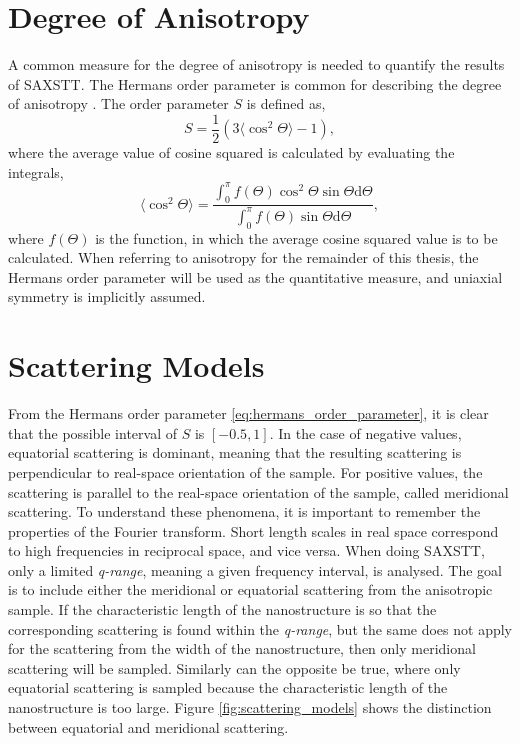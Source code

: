 \section{Degree of Anisotropy} %

A common measure for the degree of anisotropy is needed to quantify the results of SAXSTT.
The Hermans order parameter is common for describing the degree of anisotropy \cite{yoshiharu1997cellulose}.
The order parameter $S$ is defined as,
\begin{equation}\label{eq:hermans_order_parameter}
    S = \frac{1}{2} \left( 3 \langle\cos^{2} \Theta\rangle - 1 \right),
\end{equation}
where the average value of cosine squared is calculated by evaluating the integrals,
\begin{equation}
    \langle\cos^{2} \Theta\rangle = \frac{ \int_{0}^{\pi} f (\Theta) \cos^{2} \Theta \sin \Theta  \mathrm{d}\Theta  }
    {\int_{0}^{\pi} f (\Theta) \sin \Theta  \mathrm{d}\Theta },
\end{equation}
\noindent
where $f(\Theta)$ is the function, in which the average cosine squared value is to be calculated.
When referring to anisotropy for the remainder of this thesis, the Hermans order parameter will be used as the quantitative measure,
and uniaxial symmetry is implicitly assumed. %

\clearpage
\section{Scattering Models}

From the Hermans order parameter \eqref{eq:hermans_order_parameter}, it is clear that the possible interval of $S$ is $[-0.5, 1]$.
In the case of negative values, equatorial scattering is dominant, meaning that the resulting scattering is perpendicular to real-space orientation of the sample.
For positive values, the scattering is parallel to the real-space orientation of the sample, called meridional scattering.
To understand these phenomena, it is important to remember the properties of the Fourier transform.
Short length scales in real space correspond to high frequencies in reciprocal space, and vice versa.
When doing SAXSTT, only a limited \emph{q-range}, meaning a given frequency interval, is analysed.
The goal is to include either the meridional or equatorial scattering from the anisotropic sample.
If the characteristic length of the nanostructure is so that the corresponding scattering is found within the \emph{q-range},
but the same does not apply for the scattering from the width of the nanostructure, then only meridional scattering will be sampled.
Similarly can the opposite be true, where only equatorial scattering is sampled because the characteristic length of the nanostructure is too large.
Figure \ref{fig:scattering_models} shows the distinction between equatorial and meridional scattering.

